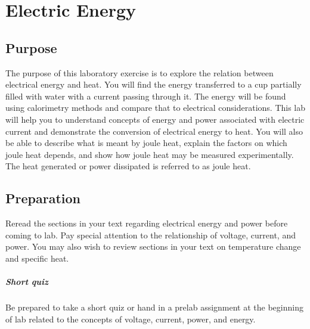 
\chapter{Electric Energy}

\section{Purpose}
  The purpose of this laboratory exercise is to explore the relation between electrical energy and heat. You will find the energy transferred to a cup partially filled with water with a current passing through it.  The energy will be found using calorimetry methods and compare that to electrical considerations.  This lab will help you to understand concepts of energy and power associated with electric current and demonstrate the conversion of electrical energy to heat. You will also be able to describe what is meant by joule heat, explain the factors on which joule heat depends, and show how joule heat may be measured experimentally. The heat generated or power dissipated is referred to as joule heat.

\section{Preparation}
  Reread the sections in your text regarding electrical energy and power before coming to lab. Pay special attention to the relationship of voltage, current, and power.  You may also wish to review sections in your text on temperature change and specific heat.
\paragraph{Short quiz }
 Be prepared to take a short quiz or hand in a prelab assignment at the beginning of lab related to the concepts of voltage, current, power, and energy.

